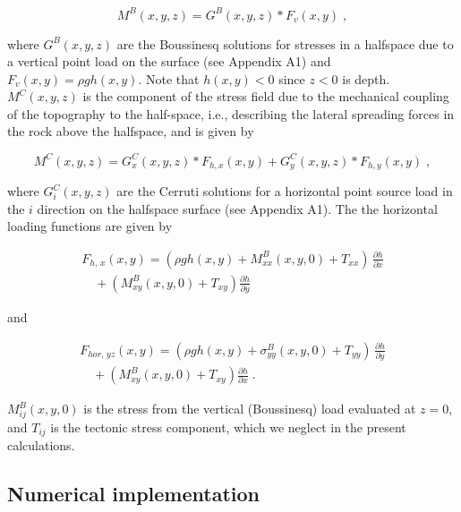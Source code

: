 \documentclass[twocolumn,jgrga]{AGUTeX}
\begin{document}
\begin{article}
\begin{equation}
M^B(x, y, z) = G^B(x,y,z) * F_v(x, y) \; ,
\label{eqn:bous}
\end{equation}

where $G^B(x,y,z)$ are the Boussinesq solutions for stresses in a
halfspace due to a vertical point load on the surface (see Appendix A1)
and $F_v(x,y) = \rho g h(x,y)$. Note that $h(x,y)<0$ since $z<0$ is
depth. $M^C(x,y,z)$ is the component of the stress field due to the
mechanical coupling of the topography to the half-space, i.e.,
describing the lateral spreading forces in the rock above the halfspace,
and is given by

\begin{equation}
M^C(x, y, z) = G_x^C(x,y,z) * F_{h, x}(x, y) + G_y^C(x,y,z) * F_{h, y}(x, y) \; ,
\end{equation}

where $G_i^C(x,y,z)$ are the Cerruti solutions for a horizontal point
source load in the $i$ direction on the halfspace surface (see Appendix
A1). The the horizontal loading functions are given by

\begin{equation}
\begin{split}
F_{h, \, x}(x,y) = ( \rho g h(x,y) + M_{xx}^B(x,y,0) + T_{xx} )\, \frac{\partial h}{ \partial x} \\
\quad + (M_{xy}^{B}(x,y,0) + T_{xy}) \frac{\partial h}{ \partial y}
\end{split}
\label{eqn:f_hor_xz}
\end{equation}

and

\begin{equation}
\begin{split}
F_{hor, \, yz}(x,y) = ( \rho g h(x,y) + \sigma_{yy}^B(x,y,0) + T_{yy} )\, \frac{\partial h}{ \partial y} \\
\quad + (M_{xy}^{B}(x,y,0) + T_{xy}) \frac{\partial h}{ \partial x}\; . 
\end{split}
\label{eqn:f_hor_yz}
\end{equation}

$M_{ij}^B(x,y,0)$ is the stress from the vertical (Boussinesq) load
evaluated at $z=0$, and $T_{ij}$ is the tectonic stress component, which
we neglect in the present calculations.

\subsection{Numerical implementation}\label{numerical-implementation}


\end{article}
\end{document}
